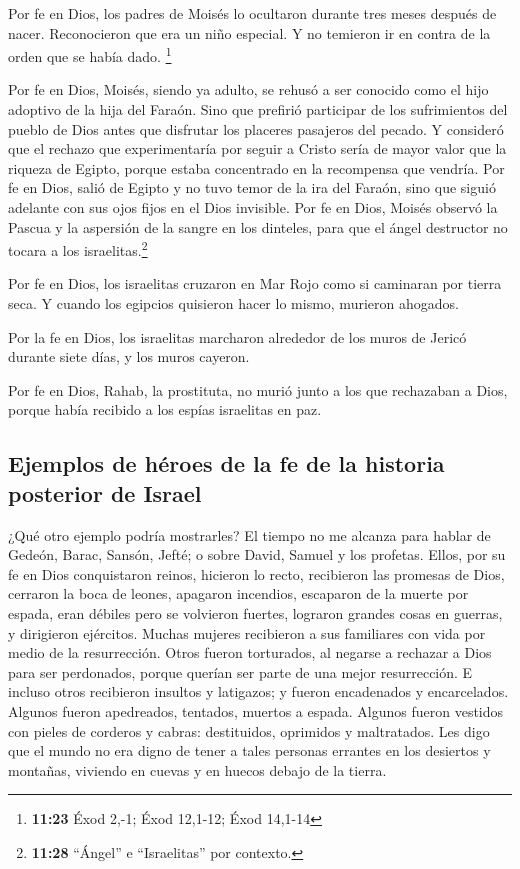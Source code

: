  Por fe en Dios, los padres de Moisés lo ocultaron
durante tres meses después de nacer. Reconocieron que era un niño
especial. Y no temieron ir en contra de la orden que se había dado.
\footnote{\textbf{11:23} Éxod 2,-1; Éxod 12,1-12; Éxod 14,1-14}

 Por fe en Dios, Moisés, siendo ya adulto, se rehusó a
ser conocido como el hijo adoptivo de la hija del Faraón.
 Sino que prefirió participar de los sufrimientos del
pueblo de Dios antes que disfrutar los placeres pasajeros del pecado.
 Y consideró que el rechazo que experimentaría por seguir
a Cristo sería de mayor valor que la riqueza de Egipto, porque estaba
concentrado en la recompensa que vendría.  Por fe en
Dios, salió de Egipto y no tuvo temor de la ira del Faraón, sino que
siguió adelante con sus ojos fijos en el Dios invisible. 
Por fe en Dios, Moisés observó la Pascua y la aspersión de la sangre en
los dinteles, para que el ángel destructor no tocara a los
israelitas.\footnote{\textbf{11:28} ``Ángel'' e ``Israelitas'' por
  contexto.}

 Por fe en Dios, los israelitas cruzaron en Mar Rojo como
si caminaran por tierra seca. Y cuando los egipcios quisieron hacer lo
mismo, murieron ahogados.

 Por la fe en Dios, los israelitas marcharon alrededor de
los muros de Jericó durante siete días, y los muros cayeron.

 Por fe en Dios, Rahab, la prostituta, no murió junto a
los que rechazaban a Dios, porque había recibido a los espías israelitas
en paz.

\hypertarget{ejemplos-de-huxe9roes-de-la-fe-de-la-historia-posterior-de-israel}{%
\subsection{Ejemplos de héroes de la fe de la historia posterior de
Israel}\label{ejemplos-de-huxe9roes-de-la-fe-de-la-historia-posterior-de-israel}}

 ¿Qué otro ejemplo podría mostrarles? El tiempo no me
alcanza para hablar de Gedeón, Barac, Sansón, Jefté; o sobre David,
Samuel y los profetas.  Ellos, por su fe en Dios
conquistaron reinos, hicieron lo recto, recibieron las promesas de Dios,
cerraron la boca de leones,  apagaron incendios,
escaparon de la muerte por espada, eran débiles pero se volvieron
fuertes, lograron grandes cosas en guerras, y dirigieron ejércitos.
 Muchas mujeres recibieron a sus familiares con vida por
medio de la resurrección. Otros fueron torturados, al negarse a rechazar
a Dios para ser perdonados, porque querían ser parte de una mejor
resurrección.  E incluso otros recibieron insultos y
latigazos; y fueron encadenados y encarcelados.  Algunos
fueron apedreados, tentados, muertos a espada. Algunos fueron vestidos
con pieles de corderos y cabras: destituidos, oprimidos y maltratados.
 Les digo que el mundo no era digno de tener a tales
personas errantes en los desiertos y montañas, viviendo en cuevas y en
huecos debajo de la tierra.

